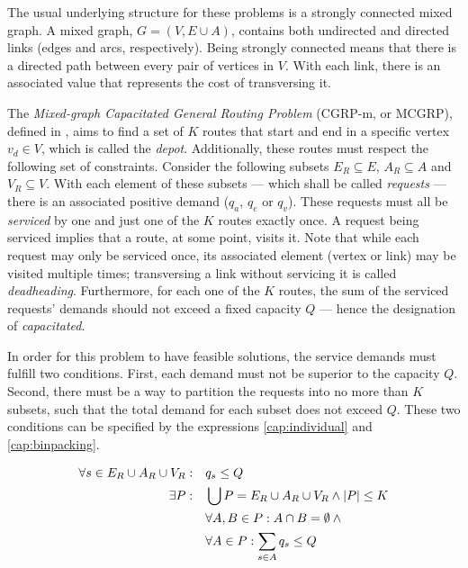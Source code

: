 The usual underlying structure for these problems is a strongly connected mixed
graph. A mixed graph, $G = (V, E \cup A)$, contains both undirected and
directed links (edges and arcs, respectively). Being strongly connected means
that there is a directed path between every pair of vertices in $V$. With each
link, there is an associated value that represents the cost of transversing it.

The \textit{Mixed-graph Capacitated General Routing Problem} (CGRP-m, or
MCGRP), defined in \citet{Cesar02,Pandit95}, aims to find a set of $K$ routes
that start and end in a specific vertex $v_d \in V$, which is called the
\textit{depot}. Additionally, these routes must respect the following set of
constraints. Consider the following subsets $E_R \subseteq E$, $A_R \subseteq
A$ and $V_R \subseteq V$. With each element of these subsets --- which shall be
called \textit{requests} --- there is an associated positive demand ($q_{a}$,
$q_{e}$ or $q_{v}$). These requests must all be \textit{serviced} by one and
just one of the $K$ routes exactly once. A request being serviced implies that
a route, at some point, visits it. Note that while each request may only be
serviced once, its associated element (vertex or link) may be visited multiple
times; transversing a link without servicing it is called \textit{deadheading}.
Furthermore, for each one of the $K$ routes, the sum of the serviced requests'
demands should not exceed a fixed capacity $Q$ --- hence the designation of
\textit{capacitated}.

In order for this problem to have feasible solutions, the service demands must
fulfill two conditions. First, each demand must not be superior to the capacity
$Q$. Second, there must be a way to partition the requests into no more than
$K$ subsets, such that the total demand for each subset does not exceed $Q$.
These two conditions can be specified by the expressions \eqref{cap:individual}
and \eqref{cap:binpacking}.

\begin{align}
  \forall s \in E_R \cup A_R \cup V_R : & \quad q_{s} \leq Q \label{cap:individual}  \\
  \exists P : &
	\quad \bigcup P = E_R \cup A_R \cup V_R \wedge |P| \leq K \notag{} \\
	& \quad \forall A, B \in P : A \cap B = \emptyset \wedge \notag{} \\
	& \quad \forall A \in P : \sum_{s \in A} q_s \leq Q
	\label{cap:binpacking}
\end{align}

